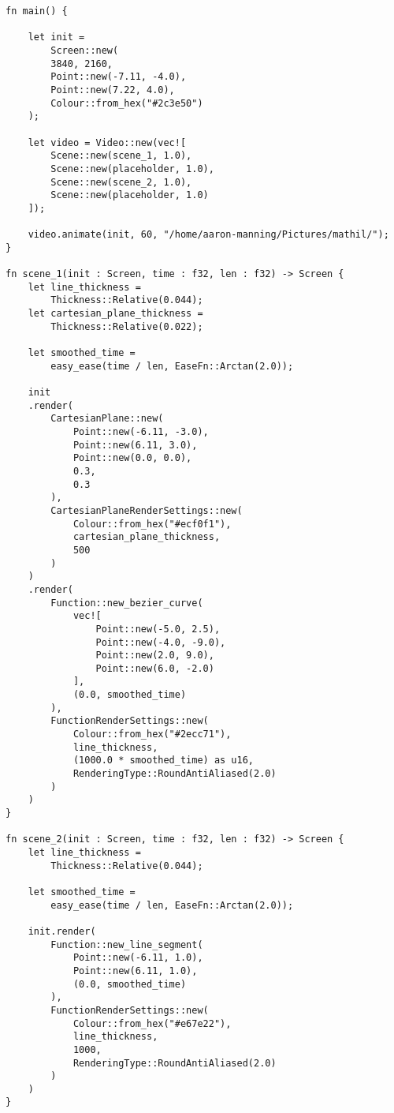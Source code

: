 \begin{lstlisting}
fn main() {

    let init =
        Screen::new(
        3840, 2160,
        Point::new(-7.11, -4.0),
        Point::new(7.22, 4.0),
        Colour::from_hex("#2c3e50")
    );
    
    let video = Video::new(vec![
        Scene::new(scene_1, 1.0),
        Scene::new(placeholder, 1.0),
        Scene::new(scene_2, 1.0),
        Scene::new(placeholder, 1.0)
    ]);

    video.animate(init, 60, "/home/aaron-manning/Pictures/mathil/");
}

fn scene_1(init : Screen, time : f32, len : f32) -> Screen {
    let line_thickness =
        Thickness::Relative(0.044);
    let cartesian_plane_thickness =
        Thickness::Relative(0.022);

    let smoothed_time =
        easy_ease(time / len, EaseFn::Arctan(2.0));

    init
    .render(
        CartesianPlane::new(
            Point::new(-6.11, -3.0),
            Point::new(6.11, 3.0),
            Point::new(0.0, 0.0),
            0.3,
            0.3
        ),
        CartesianPlaneRenderSettings::new(
            Colour::from_hex("#ecf0f1"),
            cartesian_plane_thickness,
            500
        )
    )
    .render(
        Function::new_bezier_curve(
            vec![
                Point::new(-5.0, 2.5),
                Point::new(-4.0, -9.0),
                Point::new(2.0, 9.0),
                Point::new(6.0, -2.0)
            ],
            (0.0, smoothed_time)
        ),
        FunctionRenderSettings::new(
            Colour::from_hex("#2ecc71"),
            line_thickness,
            (1000.0 * smoothed_time) as u16,
            RenderingType::RoundAntiAliased(2.0)
        )
    )   
}

fn scene_2(init : Screen, time : f32, len : f32) -> Screen {
    let line_thickness =
        Thickness::Relative(0.044);

    let smoothed_time = 
        easy_ease(time / len, EaseFn::Arctan(2.0));
        
    init.render(
        Function::new_line_segment(
            Point::new(-6.11, 1.0),
            Point::new(6.11, 1.0),
            (0.0, smoothed_time)
        ),
        FunctionRenderSettings::new(
            Colour::from_hex("#e67e22"),
            line_thickness,
            1000,
            RenderingType::RoundAntiAliased(2.0)
        )
    )
}
\end{lstlisting}

